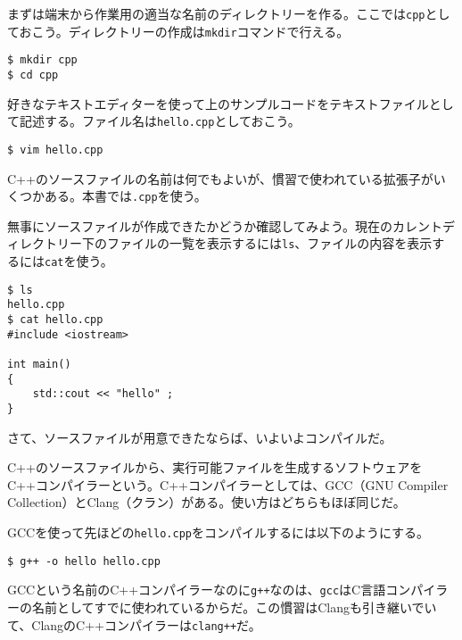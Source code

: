 まずは端末から作業用の適当な名前のディレクトリーを作る。ここでは\texttt{cpp}としておこう。ディレクトリーの作成は\texttt{mkdir}コマンドで行える。

\begin{lstlisting}[style=terminal]
$ mkdir cpp
$ cd cpp
\end{lstlisting}

好きなテキストエディターを使って上のサンプルコードをテキストファイルとして記述する。ファイル名は\texttt{hello.cpp}としておこう。

\begin{lstlisting}[style=terminal]
$ vim hello.cpp
\end{lstlisting}

C++のソースファイルの名前は何でもよいが、慣習で使われている拡張子がいくつかある。本書では\texttt{.cpp}を使う。

無事にソースファイルが作成できたかどうか確認してみよう。現在のカレントディレクトリー下のファイルの一覧を表示するには\texttt{ls}、ファイルの内容を表示するには\texttt{cat}を使う。

\begin{lstlisting}[style=terminal]
$ ls
hello.cpp
$ cat hello.cpp
#include <iostream>

int main()
{
    std::cout << "hello" ;
}
\end{lstlisting}

\ifTombow\pagebreak\fi
{}

さて、ソースファイルが用意できたならば、いよいよコンパイルだ。

C++のソースファイルから、実行可能ファイルを生成するソフトウェアをC++コンパイラーという。C++コンパイラーとしては、GCC（GNU Compiler Collection）とClang（クラン）がある。使い方はどちらもほぼ同じだ。

GCCを使って先ほどの\texttt{hello.cpp}をコンパイルするには以下のようにする。

\begin{lstlisting}[style=terminal]
$ g++ -o hello hello.cpp
\end{lstlisting}

GCCという名前のC++コンパイラーなのに\texttt{g++}なのは、\texttt{gcc}はC言語コンパイラーの名前としてすでに使われているからだ。この慣習はClangも引き継いでいて、ClangのC++コンパイラーは\texttt{clang++}だ。

